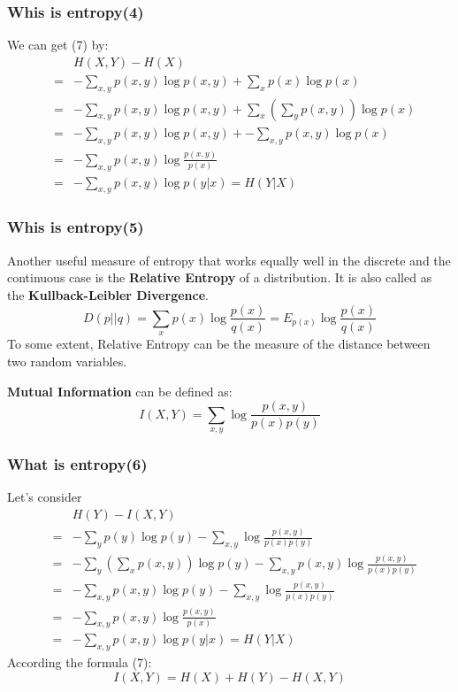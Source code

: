 \documentclass[slidestop,compress,mathserif]{beamer}
\begin{document}
	\begin{frame}[shrink]	
		\frametitle{Whis is entropy(4)}
		We can get (7) by:
		\begin{eqnarray*}
			&& H(X,Y)-H(X) \\
			&=& -\sum_{x,y}p(x,y)\log p(x,y) + \sum_x p(x)\log p(x)\\
			&=& -\sum_{x,y}p(x,y)\log p(x,y) + \sum_x\left(\sum_y p(x,y)\right)\log p(x)\\
			&=& -\sum_{x,y}p(x,y)\log p(x,y)+ -\sum_{x,y}p(x,y)\log p(x)\\
			&=& -\sum_{x,y}p(x,y)\log\frac{p(x,y)}{p(x)}\\
			&=& -\sum_{x,y} p(x,y)\log p(y|x) = H(Y|X)
		\end{eqnarray*}

	\end{frame}
	
	\begin{frame}
		\frametitle{Whis is entropy(5)}
		Another useful measure of entropy that works equally well in the discrete and the continuous case is the \textbf{Relative Entropy} of a distribution. It is also called as the \textbf{Kullback-Leibler Divergence}.
		$$D(p||q) = \sum_x p(x)\log \frac{p(x)}{q(x)} = E_{p(x)}\log\frac{p(x)}{q(x)}$$
		To some extent, Relative Entropy can be the measure of the distance between two random variables.
		
		\textbf{Mutual Information} can be defined as:
		$$I(X,Y)=\sum_{x,y}\log\frac{p(x,y)}{p(x)p(y)}$$
	\end{frame}
	
	\begin{frame}[shrink]
		\frametitle{What is entropy(6)}
		Let's consider
		\begin{eqnarray*}
			&& H(Y)-I(X,Y)  \\
			&=& -\sum_y p(y)\log p(y) - \sum_{x,y}\log\frac{p(x,y)}{p(x)p(y)} \\
			&=& -\sum_y\left(\sum_x p(x,y)\right)\log p(y) - \sum_{x,y}p(x,y)\log\frac{p(x,y)}{p(x)p(y)} \\
			&=& -\sum_{x,y}p(x,y)\log p(y) - \sum_{x,y}\log\frac{p(x,y)}{p(x)p(y)} \\
			&=& -\sum_{x,y}p(x,y)\log\frac{p(x,y)}{p(x)} \\
			&=& -\sum_{x,y}p(x,y)\log p(y|x) = H(Y|X)
		\end{eqnarray*}
		According the formula (7):
		$$I(X,Y) = H(X)+H(Y)-H(X,Y)$$
	\end{frame}
	
\end{document}
